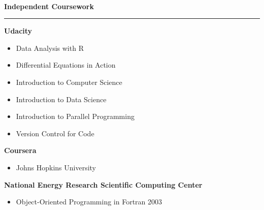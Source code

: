 \documentclass[legalpaper]{article}
\renewcommand{\labelitemi}{\tiny$\blacksquare$}
\begin{document}
~\\
\textbf{Independent Coursework}\hrule \vspace{1mm}
\textbf{Udacity}
\begin{multicols}{2}
  \begin{itemize}[noitemsep,nolistsep]
    \renewcommand{\labelitemi}{\tiny$\blacksquare$}
  \item Data Analysis with R
  \item Differential Equations in Action
  \item Introduction to Computer Science
  \item Introduction to Data Science
  \item Introduction to Parallel Programming
  \item Version Control for Code
  \end{itemize}
\end{multicols}
\vspace{\baselineskip} %
\textbf{Coursera}

\begin{itemize}[noitemsep,nolistsep]

\item Johns Hopkins University
  \begin{multicols}{2}
  \end{multicols}
  
  \vspace{2mm}
  

\end{itemize}
\vspace{\baselineskip} %
\textbf{National Energy Research Scientific Computing Center}
\begin{itemize}[noitemsep,nolistsep]
\item Object-Oriented Programming in Fortran 2003
\end{itemize}
\end{document}
